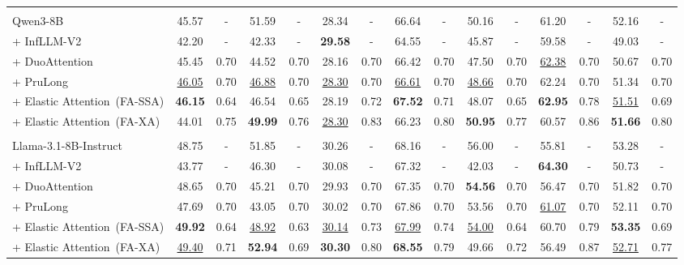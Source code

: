 \begin{table}[t]
{\begin{tabular}{l | cc | cc | cc | cc | cc | cc | cc}
\arrayrulecolor{black}
\midrule
\rowcolor{blue!25}
\multicolumn{15}{c}{\textbf{Qwen3-8B 骨干模型}} \\
\arrayrulecolor{black!20}\midrule
Qwen3-8B & 45.57 & - & 51.59 & - & 28.34 & - & 66.64 & - & 50.16 & - & 61.20 & - & 52.16 & - \\
+ InfLLM-V2 & 42.20 & - & 42.33 & - & \textbf{29.58} & - & 64.55 & - & 45.87 & - & 59.58 & - & 49.03 & - \\
+ DuoAttention & 45.45 & 0.70 & 44.52 & 0.70 & 28.16 & 0.70 & 66.42 & 0.70 & 47.50 & 0.70 & \underline{62.38} & 0.70 & 50.67 & 0.70 \\
+ PruLong & \underline{46.05} & 0.70 & \underline{46.88} & 0.70 & \underline{28.30} & 0.70 & \underline{66.61} & 0.70 & \underline{48.66} & 0.70 & 62.24 & 0.70 & 51.34 & 0.70 \\
\arrayrulecolor{black!40}\midrule
+ Elastic Attention~(FA-SSA)& \textbf{46.15} & 0.64 & 46.54 & 0.65 & 28.19 & 0.72 & \textbf{67.52} & 0.71 & 48.07 & 0.65 & \textbf{62.95} & 0.78 & \underline{51.51} & 0.69 \\
+ Elastic Attention~(FA-XA)& 44.01 & 0.75 & \textbf{49.99} & 0.76 & \underline{28.30} & 0.83 & 66.23 & 0.80 & \textbf{50.95} & 0.77 & 60.57 & 0.86 & \textbf{51.66} & 0.80 \\

\arrayrulecolor{black}
\midrule
\rowcolor{cyan!20}
\multicolumn{15}{c}{\textbf{Llama-3.1-8B-Instruct 骨干模型}} \\
\arrayrulecolor{black!20}\midrule
Llama-3.1-8B-Instruct & 48.75 & - & 51.85 & - & 30.26 & - & 68.16 & - & 56.00 & - & 55.81 & - & 53.28 & - \\
+ InfLLM-V2 & 43.77 & - & 46.30 & - & 30.08 & - & 67.32 & - & 42.03 & - & \textbf{64.30} & - & 50.73 & - \\
+ DuoAttention & 48.65 & 0.70 & 45.21 & 0.70 & 29.93 & 0.70 & 67.35 & 0.70 & \textbf{54.56} & 0.70 & 56.47 & 0.70 & 51.82 & 0.70 \\
+ PruLong & 47.69 & 0.70 & 43.05 & 0.70 & 30.02 & 0.70 & 67.86 & 0.70 & 53.56 & 0.70 & \underline{61.07} & 0.70 & 52.11 & 0.70 \\
\arrayrulecolor{black!40}\midrule
+ Elastic Attention~(FA-SSA)& \textbf{49.92} & 0.64 & \underline{48.92} & 0.63 & \underline{30.14} & 0.73 & \underline{67.99} & 0.74 & \underline{54.00} & 0.64 & 60.70 & 0.79 & \textbf{53.35} & 0.69 \\
+ Elastic Attention~(FA-XA)& \underline{49.40} & 0.71 & \textbf{52.94} & 0.69 & \textbf{30.30} & 0.80 & \textbf{68.55} & 0.79 & 49.66 & 0.72 & 56.49 & 0.87 & \underline{52.71} & 0.77 \\


\end{tabular}}
\end{table}
